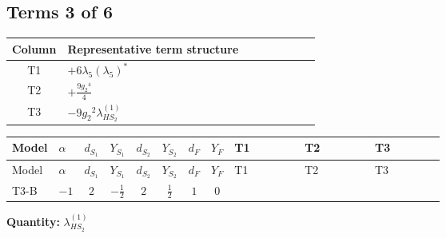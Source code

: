 \documentclass[8pt]{article}
\begin{document}
\begin{landscape}
\subsection*{Terms 3 of 6}
\begin{center}
\begin{tabular}{@{}c >{\raggedright\arraybackslash}p{0.82\linewidth}@{}}
\toprule
Column & Representative term structure \\
\midrule
T1 & \(\displaystyle +6 {\lambda_5} \left({\lambda_5}\right)^{*}\) \\
\midrule
T2 & \(\displaystyle +\frac{9 {g_2}^4}{4}\) \\
\midrule
T3 & \(\displaystyle -9 {g_2}^2 {\lambda_{HS_2}^{(1)}}\) \\
\midrule
\bottomrule
\end{tabular}
\end{center}
\smallskip
\tiny
\begin{longtable}{@{}llcccccc >{\raggedright\arraybackslash}p{0.21\linewidth} >{\raggedright\arraybackslash}p{0.21\linewidth} >{\raggedright\arraybackslash}p{0.21\linewidth}@{}}
\toprule
Model & $\alpha$ & $d_{S_1}$ & $Y_{S_1}$ & $d_{S_2}$ & $Y_{S_2}$ & $d_F$ & $Y_F$ & T1 & T2 & T3 \\
\midrule
\endfirsthead
\toprule
Model & $\alpha$ & $d_{S_1}$ & $Y_{S_1}$ & $d_{S_2}$ & $Y_{S_2}$ & $d_F$ & $Y_F$ & T1 & T2 & T3 \\
\midrule
\endhead
T3-B & $-1$ & $2$ & $-\frac{1}{2}$ & $2$ & $\frac{1}{2}$ & $1$ & $0$ & \scriptsize\adjustbox{max width=\linewidth}{$\begin{gathered} +6 {\lambda_5} \left({\lambda_5}\right)^{*}\end{gathered}$} & \scriptsize\adjustbox{max width=\linewidth}{$\begin{gathered} +\frac{9 {g_2}^4}{4}\end{gathered}$} & \scriptsize\adjustbox{max width=\linewidth}{$\begin{gathered} -9 {g_2}^2 {\lambda_{HS_2}^{(1)}}\end{gathered}$} \\
\midrule
\bottomrule
\end{longtable}
\clearpage
\noindent\textbf{Quantity: }$\lambda_{HS_2}^{(1)}$\par\smallskip

\end{landscape}
\end{document}
